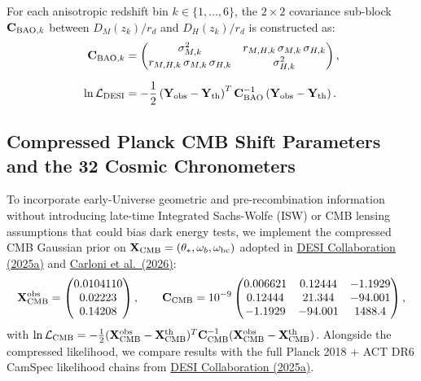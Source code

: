 \documentclass[aps,prd,preprint,superscriptaddress,nofootinbib]{revtex4-2}
\begin{document}
For each anisotropic redshift bin $k \in \{1,\dots,6\}$, the $2 \times 2$ covariance sub-block $\mathbf{C}_{{\rm BAO},k}$ between $D_M(z_k)/r_d$ and $D_H(z_k)/r_d$ is constructed as:
\begin{equation}
\begin{aligned}
    \mathbf{C}_{{\rm BAO},k} &= \begin{pmatrix} \sigma_{M,k}^2 & r_{M,H,k}\, \sigma_{M,k}\, \sigma_{H,k} \\ r_{M,H,k}\, \sigma_{M,k}\, \sigma_{H,k} & \sigma_{H,k}^2 \end{pmatrix}, \\[6pt]
    \ln \mathcal{L}_{\rm DESI} &= -\frac{1}{2} \left(\mathbf{Y}_{\rm obs} - \mathbf{Y}_{\rm th}\right)^T \mathbf{C}_{\rm BAO}^{-1} \left(\mathbf{Y}_{\rm obs} - \mathbf{Y}_{\rm th}\right).
\end{aligned}
    \label{m:eq:L_desi}
\end{equation}

\subsection{Compressed Planck CMB Shift Parameters and the 32 Cosmic Chronometers}

To incorporate early-Universe geometric and pre-recombination information without introducing late-time Integrated Sachs-Wolfe (ISW) or CMB lensing assumptions that could bias dark energy tests, we implement the compressed CMB Gaussian prior on $\mathbf{X}_{\rm CMB} = (\theta_*, \omega_b, \omega_{\rm bc})$ adopted in \href{https://arxiv.org/abs/2503.14738}{DESI Collaboration (2025a)} and \href{https://arxiv.org/pdf/2608.01215}{Carloni et al.\ (2026)}:
\begin{equation}
    \mathbf{X}_{\rm CMB}^{\rm obs} = \begin{pmatrix} 0.0104110 \\ 0.02223 \\ 0.14208 \end{pmatrix}, \qquad \mathbf{C}_{\rm CMB} = 10^{-9} \begin{pmatrix} 0.006621 & 0.12444 & -1.1929 \\ 0.12444 & 21.344 & -94.001 \\ -1.1929 & -94.001 & 1488.4 \end{pmatrix},
    \label{m:eq:cmb_compressed}
\end{equation}
with $\ln \mathcal{L}_{\rm CMB} = -\frac{1}{2}(\mathbf{X}_{\rm CMB}^{\rm obs} - \mathbf{X}_{\rm CMB}^{\rm th})^T \mathbf{C}_{\rm CMB}^{-1}(\mathbf{X}_{\rm CMB}^{\rm obs} - \mathbf{X}_{\rm CMB}^{\rm th})$. Alongside the compressed likelihood, we compare results with the full Planck 2018 + ACT DR6 CamSpec likelihood chains from \href{https://arxiv.org/abs/2503.14738}{DESI Collaboration (2025a)}.
\end{document}
